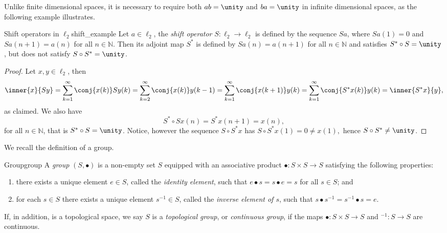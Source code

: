 Unlike finite dimensional spaces, it is necessary to require both \(ab = \unity\) and \(ba = \unity\) in infinite dimensional spaces, as the following example illustrates.
\begin{example}{Shift operators in \(\ell_2\)}{shift_example}
    Let \(a \in \ell_2\), the \emph{shift operator} \(S : \ell_2 \to \ell_2\) is defined by the sequence \(Sa\), where \(Sa(1) = 0\) and \(Sa(n+1) = a(n)\) for all \(n \in \mathbb{N}\). Then its adjoint map \(S^*\) is defined by \(Sa(n) = a(n+1)\) for all \(n \in \mathbb{N}\) and satisfies \(S^*\circ S = \unity\), but does not satisfy \(S \circ S^* = \unity\).
\end{example}
\begin{proof}
    Let \(x,y \in \ell_2\), then
    \begin{align*}
        \inner{x}{Sy} = \sum_{k=1}^\infty \conj{x(k)} Sy(k)
                      = \sum_{k=2}^\infty \conj{x(k)} y(k-1)
                      = \sum_{k=1}^\infty \conj{x(k+1)}y(k)
                      = \sum_{k=1}^\infty \conj{S^*x(k)}y(k)
                      = \inner{S^*x}{y},
    \end{align*}
    as claimed. We also have
    \begin{equation*}
        S^* \circ Sx(n) = S^*x(n+1) = x(n),
    \end{equation*}
    for all \(n \in \mathbb{N}\), that is \(S^* \circ S = \unity\). Notice, however the sequence \(S \circ S^* x\) has \(S\circ S^* x(1) = 0 \neq x(1),\) hence \(S \circ S^* \neq \unity\).
\end{proof}

We recall the definition of a group.
\begin{definition}{Group}{group}
    A \emph{group} \((S, \bullet)\) is a non-empty set \(S\) equipped with an associative product \(\bullet : S \times S \to S\) satisfying the following properties:
    \begin{enumerate}[label=(\alph*)]
        \item there exists a unique element \(e \in S\), called the \emph{identity element}, such that \(e\bullet s = s \bullet e = s\) for all \(s \in S\); and
        \item for each \(s \in S\) there exists a unique element \(s^{-1} \in S\), called the \emph{inverse element of \(s\)}, such that \(s \bullet s^{-1} = s^{-1} \bullet s = e\).
    \end{enumerate}
    If, in addition,  is a topological space, we say \(S\) is a \emph{topological group}, or \emph{continuous group}, if the maps \(\bullet : S \times S \to S\) and \(^{-1} : S \to S\) are continuous.
\end{definition}

